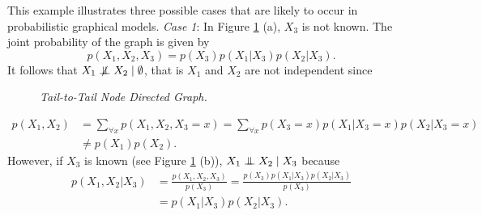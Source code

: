 \begin{exmp}
This example illustrates three possible cases that are likely to occur in probabilistic graphical models.
\textit{Case 1}: In Figure \ref{fig:case1} (a), $X_3$ is not known. The joint probability of the graph is given by
$$
 p(X_1,X_2,X_3)= p(X_3) p(X_1|X_3) p(X_2|X_3).
$$
It follows that $X_1\nCI X_2\mid \emptyset$, that is $X_1$ and $X_2$ are not independent since
\begin{figure}
\begin{minipage}[c]{\textwidth}
\centering
\begin{subfigure}[b]{.5\textwidth}
\centering
{}
\end{subfigure}\hspace{-1cm}
\begin{subfigure}[b]{.5\textwidth}
\centering
{}
\end{subfigure}
\end{minipage}
\caption[Tail-to-Tail Node Directed Graph]{\it Tail-to-Tail Node Directed Graph.}
\label{fig:case1}
\end{figure}
\vspace{.3cm}
$$
\begin{aligned}
 p(X_1,X_2)&=\sum_{\forall x} p(X_1,X_2,X_3=x)=\sum_{\forall x} p(X_3=x) p(X_1|X_3=x) p(X_2|X_3=x)\\
&\neq  p(X_1) p(X_2).
\end{aligned}
$$
However, if $X_3$ is known (see Figure \ref{fig:case1} (b)), $X_1\mathrel{\perp\mspace{-10mu}\perp} X_2\mid X_3$ because\vspace{.3cm}
$$
\begin{aligned}
 p(X_1,X_2|X_3)&=\frac{ p(X_1,X_2,X_3)}{ p(X_3)}=\frac{ p(X_3) p(X_1|X_3) p(X_2|X_3)}{ p(X_3)}\\
&= p(X_1|X_3) p(X_2|X_3).
\end{aligned}
$$\vspace{-.5cm}


\end{exmp}
